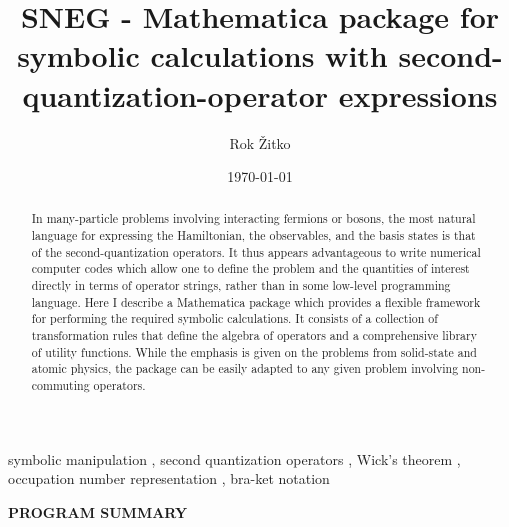 \documentclass[3p,number,preprint]{elsarticle}
\begin{document}
\title{SNEG - Mathematica package for symbolic calculations with
second-quantization-operator expressions}

\author[rz]{Rok \v{Z}itko}

\address[rz]{J. Stefan Institute, Jamova 39, SI-1000 Ljubljana, Slovenia}

\date{\today}

\begin{keyword}
symbolic manipulation 
\sep
second quantization operators
\sep 
Wick's theorem
\sep
occupation number representation
\sep
bra-ket notation
\end{keyword}

\begin{abstract}
In many-particle problems involving interacting fermions or bosons,
the most natural language for expressing the Hamiltonian, the
observables, and the basis states is that of the second-quantization
operators. It thus appears advantageous to write numerical computer
codes which allow one to define the problem and the quantities of
interest directly in terms of operator strings, rather than in some
low-level programming language. Here I describe a Mathematica package
which provides a flexible framework for performing the required
symbolic calculations. It consists of a collection of transformation
rules that define the algebra of operators and a comprehensive library
of utility functions. While the emphasis is given on the problems from
solid-state and atomic physics, the package can be easily adapted to
any given problem involving non-commuting operators.
\end{abstract}


\maketitle

{\bf PROGRAM SUMMARY}
\end{document}
